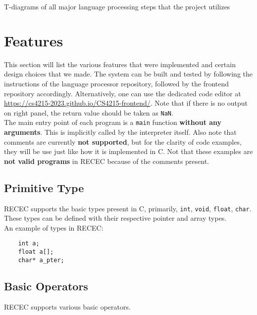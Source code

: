 \documentclass[a4paper]{article}
\begin{document}
T-diagrams of all major language processing steps that the project utilizes

\section{Features}
\label{user}


This section will list the various features that were implemented and certain design choices that we made. The system can be built and tested by following the instructions of the language processor repository, followed by the frontend repository accordingly. Alternatively, one can use the dedicated code editor at \url{https://cs4215-2023.github.io/CS4215-frontend/}. Note that if there is no output on right panel, the return value should be taken as \texttt{NaN}.
\\

The main entry point of each program is a \texttt{main} function \textbf{without any arguments}. This is implicitly called by the interpreter itself. Also note that comments are currently \textbf{not supported}, but for the clarity of code examples, they will be use just like how it is implemented in C. Not that these examples are \textbf{not valid programs} in RECEC because of the comments present.  

\subsection{Primitive Type}
\label{types}
RECEC supports the basic types present in C, primarily, \texttt{int}, \texttt{void}, \texttt{float}, \texttt{char}. These types can be defined with their respective pointer and array types. \\

An example of types in RECEC:

\begin{verbatim}
	int a;
	float a[];
	char* a_pter;
\end{verbatim}

\subsection{Basic Operators}
RECEC supports various basic operators.
\end{document}
